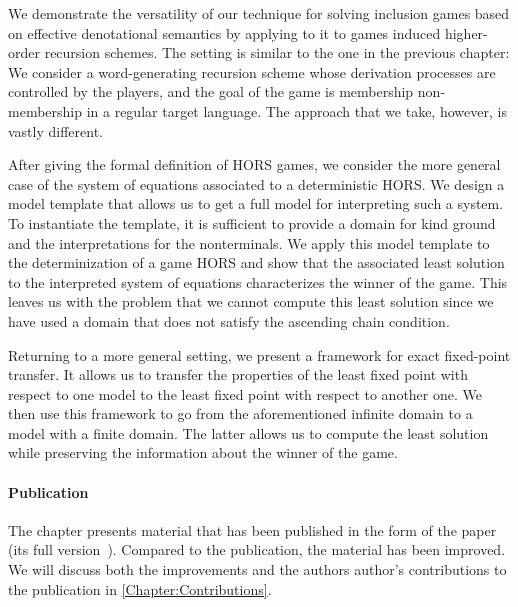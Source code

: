 \documentclass[../../diss.tex]{subfiles}
\begin{document}
We demonstrate the versatility of our technique for solving inclusion games based on effective denotational semantics by applying to it to games induced higher-order recursion schemes.
The setting is similar to the one in the previous chapter:
We consider a word-generating recursion scheme whose derivation processes are controlled by the players, and the goal of the game is membership \resp non-membership in a regular target language.
The approach that we take, however, is vastly different.

After giving the formal definition of HORS games, we consider the more general case of the system of equations associated to a deterministic HORS.\@
We design a model template that allows us to get a full model for interpreting such a system.
To instantiate the template, it is sufficient to provide a domain for kind ground and the interpretations for the nonterminals.
We apply this model template to the determinization of a game HORS and show that the associated least solution to the interpreted system of equations characterizes the winner of the game.
This leaves us with the problem that we cannot compute this least solution since we have used a domain that does not satisfy the ascending chain condition.

Returning to a more general setting, we present a framework for exact fixed-point transfer.
It allows us to transfer the properties of the least fixed point with respect to one model to the least fixed point with respect to another one.
We then use this framework to go from the aforementioned infinite domain to a model with a finite domain.
The latter allows us to compute the least solution while preserving the information about the winner of the game.

\paragraph{Publication}

The chapter presents material that has been published in the form of the paper~\cite{HagueMM17} (\resp its full version~\cite{HagueMM17a}).
Compared to the publication, the material has been improved.
We will discuss both the improvements and the authors author's contributions to the publication in \cref{Chapter:Contributions}.
\end{document}
